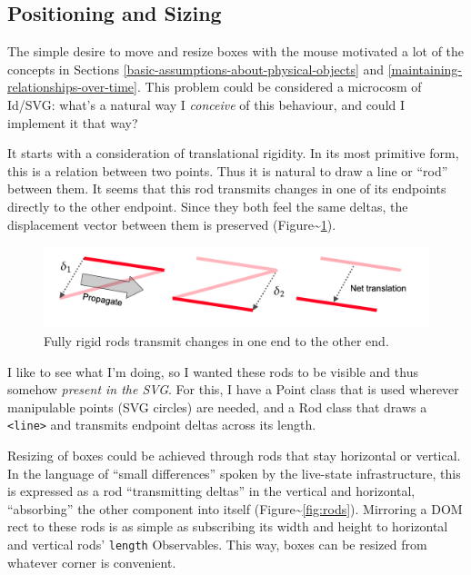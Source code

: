 \hypertarget{positioning-and-sizing}{%
\subsection{Positioning and Sizing}\label{positioning-and-sizing}}

The simple desire to move and resize boxes with the mouse motivated a
lot of the concepts in Sections
\ref{basic-assumptions-about-physical-objects} and
\ref{maintaining-relationships-over-time}. This problem could be
considered a microcosm of Id{}/SVG: what's a natural way I
\emph{conceive} of this behaviour, and could I implement it that way?

It starts with a consideration of translational rigidity. In its most
primitive form, this is a relation between two points. Thus it is
natural to draw a line or ``rod'' between them. It seems that this rod
transmits changes in one of its endpoints directly to the other
endpoint. Since they both feel the same deltas, the displacement vector
between them is preserved
(Figure\textasciitilde{}\ref{fig:delta-transmission}).

\begin{figure}
  \centering
  \includegraphics[width=\textwidth]{../delta-transmission.png}
  \caption{Fully rigid rods transmit changes in one end to the other end. \label{fig:delta-transmission}}
\end{figure}

I like to see what I'm doing, so I wanted these rods to be visible and
thus somehow \emph{present in the SVG}. For this, I have a Point class
that is used wherever manipulable points (SVG circles) are needed, and a
Rod class that draws a \texttt{\textless{}line\textgreater{}} and
transmits endpoint deltas across its length.

Resizing of boxes could be achieved through rods that stay horizontal or
vertical. In the language of ``small differences'' spoken by the
live-state infrastructure, this is expressed as a rod ``transmitting
deltas'' in the vertical and horizontal, ``absorbing'' the other
component into itself (Figure\textasciitilde{}\ref{fig:rods}). Mirroring
a DOM rect to these rods is as simple as subscribing its width and
height to horizontal and vertical rods' \texttt{length} Observables.
This way, boxes can be resized from whatever corner is convenient.

